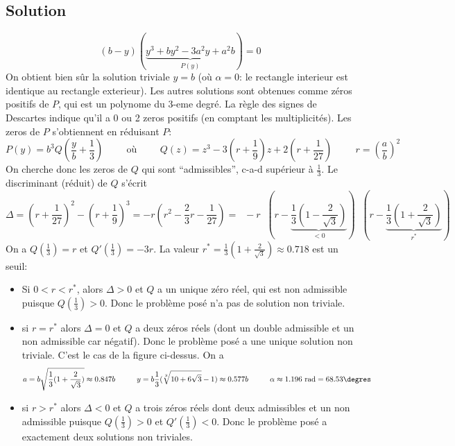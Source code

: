 \documentclass{article}
\newenvironment{solution}{\subsection{Solution}}{\pagebreak}
\begin{document}
\begin{solution}
\[
(b-y)(\underbrace{y^3+by^2-3a^2y+a^2b}_{P(y)})=0
\]
On obtient bien sûr la solution triviale $y=b$ (où $\alpha=0$: le rectangle interieur est identique au rectangle exterieur). Les autres solutions sont obtenues comme zéros positifs de $P$, qui est un polynome du 3-eme degré. La règle des signes de Descartes indique qu'il a 0 ou 2 zeros positifs (en comptant les multiplicités). Les zeros de $P$ s'obtiennent en réduisant $P$:
\[
P(y) = b^3Q(\frac{y}{b}+\frac{1}{3})
\hspace{1cm}\textrm{où}\hspace{1cm}
Q(z)=z^3-3(r+\frac{1}{9})z+2(r+\frac{1}{27})
\hspace{1cm}
r=\left(\frac{a}{b}\right)^2
\]
On cherche donc les zeros de $Q$ qui sont ``admissibles'', c-a-d supérieur à $\frac{1}{3}$. Le discriminant (réduit) de $Q$ s'écrit
\[
\Delta = (r+\frac{1}{27})^2-(r+\frac{1}{9})^3=-r(r^2-\frac{2}{3}r-\frac{1}{27}) =
\;\;-r\;\;(r-\underbrace{\frac{1}{3}(1-\frac{2}{\sqrt{3}})}_{<0})\;\;(r-\underbrace{\frac{1}{3}(1+\frac{2}{\sqrt{3}})}_{r^*})
\]
On a $Q(\frac{1}{3})=r$ et $Q'(\frac{1}{3})=-3r$. La valeur $r^*=\frac{1}{3}(1+\frac{2}{\sqrt{3}})\approx0.718$ est un seuil:
\begin{itemize}
\item
Si $0<r<r^*$, alors $\Delta>0$ et $Q$ a un unique zéro réel, qui est non admissible puisque $Q(\frac{1}{3})>0$. Donc le problème posé n'a pas de solution non triviale.
\item
si $r=r^*$ alors $\Delta=0$ et $Q$ a deux zéros réels (dont un double admissible et un non admissible car négatif). Donc le problème posé a une unique solution non triviale. C'est le cas de la figure ci-dessus. On a
\[
a=b\sqrt{\frac{1}{3}(1+\frac{2}{\sqrt{3}})}\approx0.847b
\hspace{1cm}
y=b\frac{1}{3}(\sqrt[3]{10+6\sqrt{3}}-1)\approx0.577b
\hspace{1cm}
\alpha\approx1.196\textrm{ rad}=68.53\degres
\]
\item
si $r>r^*$ alors $\Delta<0$ et $Q$ a trois zéros réels dont deux admissibles et un non admissible puisque $Q(\frac{1}{3})>0$ et $Q'(\frac{1}{3})<0$. Donc le problème posé a exactement deux solutions non triviales.
\end{itemize}
\end{solution}

\end{document}

